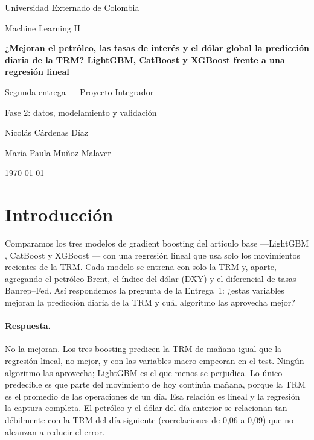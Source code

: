 \documentclass[11pt,letterpaper]{article}
\newcommand{\tituloproyecto}{¿Mejoran el petróleo, las tasas de interés y el dólar global la predicción diaria de la TRM? LightGBM, CatBoost y XGBoost frente a una regresión lineal}
\newcommand{\integranteuno}{Nicolás Cárdenas Díaz}
\newcommand{\integrantedos}{María Paula Muñoz Malaver}
\begin{document}
\begin{titlepage}
\centering
\vspace*{1.5cm}

{\large Universidad Externado de Colombia\par}
{\large Machine Learning II\par}

\vspace{2.5cm}

{\Large \textbf{\tituloproyecto}\par}

\vspace{1cm}

{\large Segunda entrega --- Proyecto Integrador\par}
{\large Fase 2: datos, modelamiento y validación\par}

\vspace{2.5cm}

{\large \integranteuno \par}
{\large \integrantedos \par}

\vfill

{\large \today\par}

\end{titlepage}


\section*{Introducción}

Comparamos los tres modelos de gradient boosting del artículo base \cite{articulo} ---LightGBM \cite{lightgbm}, CatBoost \cite{catboost} y XGBoost \cite{xgboost}--- con una regresión lineal que usa solo los movimientos recientes de la TRM. Cada modelo se entrena con solo la TRM y, aparte, agregando el petróleo Brent, el índice del dólar (DXY) y el diferencial de tasas Banrep--Fed. Así respondemos la pregunta de la Entrega~1: ¿estas variables mejoran la predicción diaria de la TRM y cuál algoritmo las aprovecha mejor?

\paragraph{Respuesta.} No la mejoran. Los tres boosting predicen la TRM de mañana igual que la regresión lineal, no mejor, y con las variables macro empeoran en el test. Ningún algoritmo las aprovecha; LightGBM es el que menos se perjudica. Lo único predecible es que parte del movimiento de hoy continúa mañana, porque la TRM es el promedio de las operaciones de un día. Esa relación es lineal y la regresión la captura completa. El petróleo y el dólar del día anterior se relacionan tan débilmente con la TRM del día siguiente (correlaciones de 0,06 a 0,09) que no alcanzan a reducir el error.
\end{document}
